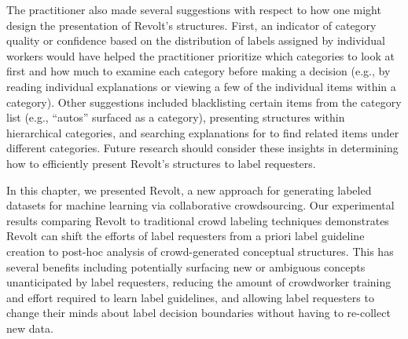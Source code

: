 The practitioner also made several suggestions with respect to how one might design the presentation of Revolt's structures. First, an indicator of category quality or confidence based on the distribution of labels assigned by individual workers would have helped the practitioner prioritize which categories to look at first and how much to examine each category before making a decision (e.g., by reading individual explanations or viewing a few of the individual items within a category). Other suggestions included blacklisting certain items from the category list (e.g., ``autos'' surfaced as a category), presenting structures within hierarchical categories, and searching explanations for to find related items under different categories. Future research should consider these insights in determining how to efficiently present Revolt's structures to label requesters.




In this chapter, we presented Revolt, a new approach for generating labeled datasets for machine learning via collaborative crowdsourcing. Our experimental results comparing Revolt to traditional crowd labeling techniques demonstrates Revolt can shift the efforts of label requesters from a priori label guideline creation to post-hoc analysis of crowd-generated conceptual structures. This has several benefits including potentially surfacing new or ambiguous concepts unanticipated by label requesters, reducing the amount of crowdworker training and effort required to learn label guidelines, and allowing label requesters to change their minds about label decision boundaries without having to re-collect new data. 



